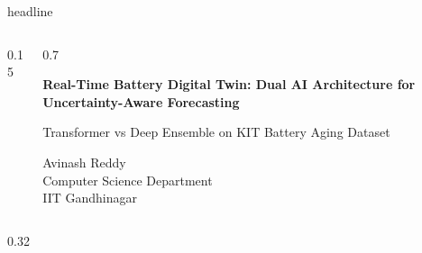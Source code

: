 \documentclass[final]{beamer}
\begin{document}
\begin{frame}[t]
\vspace*{-3cm}



\begin{beamercolorbox}[wd=\paperwidth,ht=9cm]{headline}

\begin{columns}

\begin{column}{0.15\paperwidth}
\centering
\end{column}

\begin{column}{0.7\paperwidth}
\centering

{\color{white}\Huge\bfseries
Real-Time Battery Digital Twin: Dual AI Architecture for Uncertainty-Aware Forecasting}

\vspace{0.6cm}

{\color{white}\Large
Transformer vs Deep Ensemble on KIT Battery Aging Dataset}

\vspace{0.4cm}

{\color{white}\large
Avinash Reddy \\ Computer Science Department \\ IIT Gandhinagar}

\end{column}

\end{columns}

\end{beamercolorbox}

\vspace{1cm}


\begin{columns}[t]


\begin{column}{0.32\textwidth}


\end{column}
\end{columns}
\end{frame}
\end{document}
